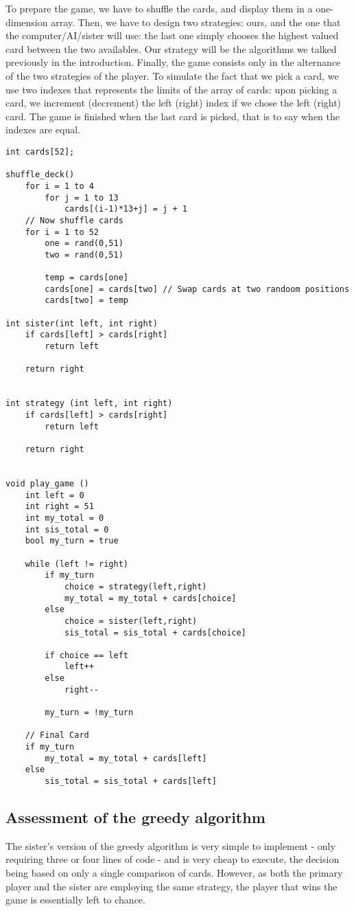\documentclass[11pt]{article}
\begin{document}
To prepare the game, we have to shuffle the cards, and display them in a one-dimension array.
Then, we have to design two strategies: ours, and the one that the computer/AI/sister will use: the last one simply chooses the highest valued card between the two availables.
Our strategy will be the algorithms we talked previously in the introduction.
Finally, the game consists only in the alternance of the two strategies of the player.
To simulate the fact that we pick a card, we use two indexes that represents the limits of the array of cards: upon picking a card, we increment (decrement) the left (right) index if we chose the left (right) card. The game is finished when the last card is picked, that is to say when the indexes are equal.

\begin{lstlisting}
int cards[52];

shuffle_deck()
	for i = 1 to 4
		for j = 1 to 13
			cards[(i-1)*13+j] = j + 1
	// Now shuffle cards
	for i = 1 to 52
		one = rand(0,51)
		two = rand(0,51)

		temp = cards[one]
		cards[one] = cards[two] // Swap cards at two randoom positions
		cards[two] = temp

int sister(int left, int right)
	if cards[left] > cards[right]
		return left
	
	return right


int strategy (int left, int right)
	if cards[left] > cards[right]
		return left

	return right


void play_game ()
	int left = 0
	int right = 51
	int my_total = 0
	int sis_total = 0
	bool my_turn = true

	while (left != right)
		if my_turn
			choice = strategy(left,right)
			my_total = my_total + cards[choice]
		else
			choice = sister(left,right)
			sis_total = sis_total + cards[choice]

		if choice == left
			left++
		else
			right--

		my_turn = !my_turn

	// Final Card
	if my_turn
		my_total = my_total + cards[left]
	else
		sis_total = sis_total + cards[left]
\end{lstlisting}

\subsection{Assessment of the greedy algorithm}

The sister's version of the greedy algorithm is very simple to implement - only requiring three or four lines of code - and is very cheap to execute, the decision being based on only a single comparison of cards. However, as both the primary player and the sister are employing the same strategy, the player that wins the game is essentially left to chance.
\end{document}
